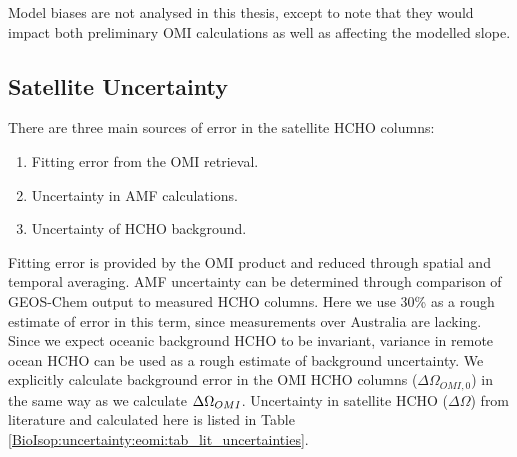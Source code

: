     Model biases are not analysed in this thesis, except to note that they would impact both preliminary OMI calculations as well as affecting the modelled slope. 
    
    
  \subsection{Satellite Uncertainty}
    \label{BioIsop:uncertainty:satellite}
    
    
    There are three main sources of error in the satellite HCHO columns:
    \begin{enumerate}
      \item Fitting error from the OMI retrieval.
      \item Uncertainty in AMF calculations.
      \item Uncertainty of HCHO background.
    \end{enumerate}
    Fitting error is provided by the OMI product and reduced through spatial and temporal averaging.
    AMF uncertainty can be determined through comparison of GEOS-Chem output to measured HCHO columns.
    Here we use 30\% as a rough estimate of error in this term, since measurements over Australia are lacking.
    Since we expect oceanic background HCHO to be invariant, variance in remote ocean HCHO can be used as a rough estimate of background uncertainty.
    We explicitly calculate background error in the OMI HCHO columns ($\Delta \Omega_{OMI,0}$) in the same way as we calculate $\Delta \Omega_{OMI}$.
    Uncertainty in satellite HCHO ($\Delta{\Omega}$) from literature and calculated here is listed in Table \ref{BioIsop:uncertainty:eomi:tab_lit_uncertainties}.
    
